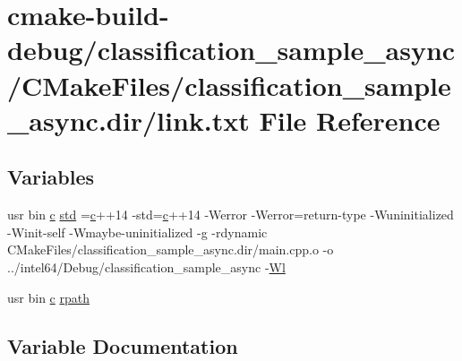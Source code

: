 \hypertarget{classification__sample__async_2CMakeFiles_2classification__sample__async_8dir_2link_8txt}{}\section{cmake-\/build-\/debug/classification\+\_\+sample\+\_\+async/\+C\+Make\+Files/classification\+\_\+sample\+\_\+async.dir/link.txt File Reference}
\label{classification__sample__async_2CMakeFiles_2classification__sample__async_8dir_2link_8txt}
\subsection*{Variables}
\begin{DoxyCompactItemize}
\item 
usr bin \hyperlink{CMakeCache_8txt_aac1d6a1710812201527c735f7c6afbaa}{c} \hyperlink{classification__sample__async_2CMakeFiles_2classification__sample__async_8dir_2link_8txt_a1ccfea5f558575a112db71eeb271fabf}{std} =\hyperlink{CMakeCache_8txt_aac1d6a1710812201527c735f7c6afbaa}{c}++14 -\/std=\hyperlink{CMakeCache_8txt_aac1d6a1710812201527c735f7c6afbaa}{c}++14 -\/Werror -\/Werror=return-\/type -\/Wuninitialized -\/Winit-\/self -\/Wmaybe-\/uninitialized -\/g -\/rdynamic C\+Make\+Files/classification\+\_\+sample\+\_\+async.\+dir/main.\+cpp.\+o -\/o ../intel64/Debug/classification\+\_\+sample\+\_\+async -\/\hyperlink{thirdparty_2extension_2CMakeFiles_2cpu__extension_8dir_2link_8txt_af9ccbf658ed2deb89d0d79f211e5b033}{Wl}
\item 
usr bin \hyperlink{CMakeCache_8txt_aac1d6a1710812201527c735f7c6afbaa}{c} \hyperlink{classification__sample__async_2CMakeFiles_2classification__sample__async_8dir_2link_8txt_ab9d7fd7120fafa2118a4e08c1df697c7}{rpath}
\end{DoxyCompactItemize}


\subsection{Variable Documentation}
